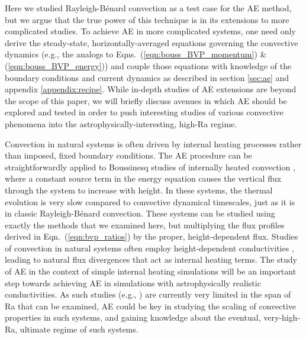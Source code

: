 \documentclass[aps, pre, onecolumn, nofootinbib, notitlepage, groupedaddress, amsfonts, amssymb, amsmath, longbibliography]{revtex4-1}
\newcommand{\RB}{Rayleigh-B\'{e}nard }
\begin{document}
Here we studied \RB convection as a test case for the AE method, but we argue that
the true power of this technique is in its extensions to more complicated studies.
To achieve AE in more complicated systems, one need only derive 
the steady-state, horizontally-averaged equations governing
the convective dynamics
(e.g., the analogs to Eqns.~(\ref{eqn:bouss_BVP_momentum}) \& (\ref{eqn:bouss_BVP_energy}))
and couple those equations with knowledge of the boundary conditions
and current dynamics as described in
section \ref{sec:ae} and appendix \ref{appendix:recipe}.
While in-depth studies of AE extensions are beyond the 
scope of this paper, we will briefly discuss
avenues in which AE should be explored and tested in order
to push interesting studies of various convective phenomena into
the astrophysically-interesting, high-Ra regime.

Convection in natural systems is often driven by internal heating processes
rather than imposed, fixed boundary conditions. The AE procedure can be straightforwardly
applied to Boussinesq studies of internally heated convection \cite{goluskin2016},
where a constant source term in the energy equation causes 
the vertical flux through the system to increase with height.
In these systems, the thermal evolution is very slow compared to convective
dynamical timescales, just as it is in classic \RB convection.
These systems can be
studied using exactly the methods that we examined here, but 
multiplying the flux profiles derived
in Eqn.~(\ref{eqn:bvp_ratios}) by the proper, height-dependent flux. Studies of
convection in natural systems often employ height-dependent conductivities
\cite{brandenburg2016, kapyla&all2017}, leading
to natural flux divergences that act as internal heating terms.
The study
of AE in the context of simple internal heating simulations will be an important step
towards achieving AE in simulations with astrophysically realistic conductivities.
As such studies (e.g., \cite{kapyla&all2017}) are currently very limited in the
span of Ra that can be examined, AE could be key in studying the scaling of convective
properties in such systems, and gaining knowledge about the eventual, very-high-Ra,
ultimate regime of such systems.
\end{document}
